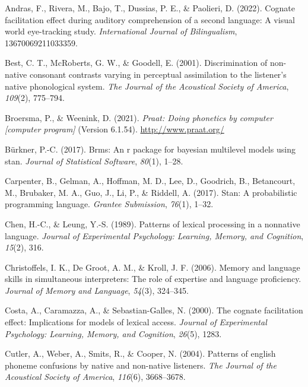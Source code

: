 \documentclass[
]{article}
\newlength{\cslhangindent}
\newenvironment{CSLReferences}[2] %
 {\begin{list}{}{%
  \setlength{\itemindent}{0pt}
  \setlength{\leftmargin}{0pt}
  \setlength{\parsep}{0pt}
  \ifodd #1
   \setlength{\leftmargin}{\cslhangindent}
   \setlength{\itemindent}{-1\cslhangindent}
  \fi
  \setlength{\itemsep}{#2\baselineskip}}}
 {\end{list}}
\begin{document}
\label{refs}
\begin{CSLReferences}{1}{0}
Andras, F., Rivera, M., Bajo, T., Dussias, P. E., \& Paolieri, D.
(2022). Cognate facilitation effect during auditory comprehension of a
second language: A visual world eye-tracking study. \emph{International
Journal of Bilingualism}, 13670069211033359.

Best, C. T., McRoberts, G. W., \& Goodell, E. (2001). Discrimination of
non-native consonant contrasts varying in perceptual assimilation to the
listener's native phonological system. \emph{The Journal of the
Acoustical Society of America}, \emph{109}(2), 775--794.

Broersma, P., \& Weenink, D. (2021). \emph{Praat: Doing phonetics by
computer {[}computer program{]}} (Version 6.1.54).
\url{http://www.praat.org/}

Bürkner, P.-C. (2017). Brms: An r package for bayesian multilevel models
using stan. \emph{Journal of Statistical Software}, \emph{80}(1), 1--28.

Carpenter, B., Gelman, A., Hoffman, M. D., Lee, D., Goodrich, B.,
Betancourt, M., Brubaker, M. A., Guo, J., Li, P., \& Riddell, A. (2017).
Stan: A probabilistic programming language. \emph{Grantee Submission},
\emph{76}(1), 1--32.

Chen, H.-C., \& Leung, Y.-S. (1989). Patterns of lexical processing in a
nonnative language. \emph{Journal of Experimental Psychology: Learning,
Memory, and Cognition}, \emph{15}(2), 316.

Christoffels, I. K., De Groot, A. M., \& Kroll, J. F. (2006). Memory and
language skills in simultaneous interpreters: The role of expertise and
language proficiency. \emph{Journal of Memory and Language},
\emph{54}(3), 324--345.

Costa, A., Caramazza, A., \& Sebastian-Galles, N. (2000). The cognate
facilitation effect: Implications for models of lexical access.
\emph{Journal of Experimental Psychology: Learning, Memory, and
Cognition}, \emph{26}(5), 1283.

Cutler, A., Weber, A., Smits, R., \& Cooper, N. (2004). Patterns of
english phoneme confusions by native and non-native listeners. \emph{The
Journal of the Acoustical Society of America}, \emph{116}(6),
3668--3678.


\end{CSLReferences}
\end{document}
